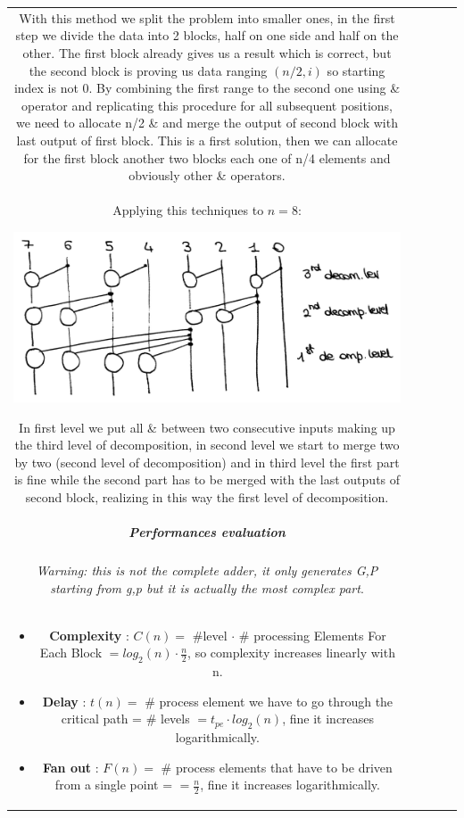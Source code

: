 \begin{center}
\begin{tabular}{|c|c|c|c|c|}
With this method we split the problem into smaller ones, in the first step we divide the data into 2 blocks, half on one side and half on the other. The first block already gives us a result which is correct, but the second block is proving us data ranging $(n/2, i)$ so starting index is not 0. By combining the first range to the second one using \& operator and replicating this procedure for all subsequent positions, we need to allocate n/2 \& and merge the output of second block with last output of first block.
This is a first solution, then we can allocate for the first block another two blocks each one of n/4 elements and obviously other \& operators.\\

Applying this techniques to $n=8$:

\begin{center}
  \includegraphics[width=0.7\linewidth]{img/img2/21}
\end{center}

In first level we put all \& between two consecutive inputs making up the third level of decomposition, in second level we start to merge two by two (second level of decomposition)
and in third level the first part is fine while the second part has to be merged with the last outputs of second block, realizing in this way the first level of decomposition.

\subparagraph{Performances evaluation}
\textit{Warning: this is not the complete adder, it only generates G,P starting from g,p but it is actually the most complex part}.\\

\begin{itemize}
  \item \textbf{Complexity} : $ C(n) = $ \#level $\cdot$ \# processing Elements For Each Block $=log_2 (n) \cdot \frac{n}{2}$, so complexity increases linearly with n.
  \item \textbf{Delay} : $ t(n) = $ \# process element we have to go through the critical path = \# levels $= t_{pe} \cdot log_2(n)  $, fine it increases logarithmically.
  \item \textbf{Fan out} : $ F(n) = $ \# process elements that have to be driven from a single point = $= \frac{n}{2}   $, fine it increases logarithmically.


\end{itemize}
\end{tabular}
\end{center}
